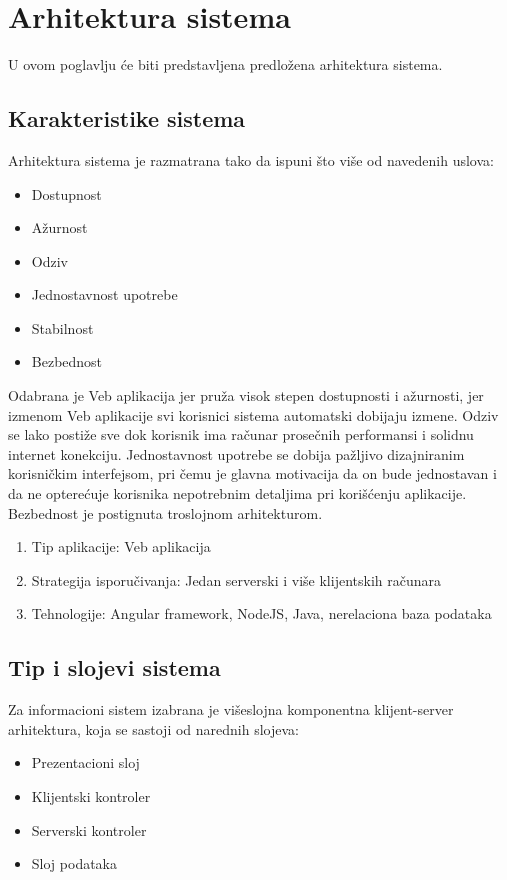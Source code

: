 \documentclass[a4paper]{article}
\begin{document}
\section{Arhitektura sistema}
U ovom poglavlju će biti predstavljena predložena arhitektura sistema.

\subsection{Karakteristike sistema}
Arhitektura sistema je razmatrana tako da ispuni što više od navedenih uslova:
\begin{itemize}
    \item Dostupnost
    \item Ažurnost
    \item Odziv
    \item Jednostavnost upotrebe
    \item Stabilnost
    \item Bezbednost
\end{itemize}
Odabrana je Veb aplikacija jer pruža visok stepen dostupnosti i ažurnosti, jer izmenom Veb aplikacije svi korisnici sistema automatski dobijaju izmene. Odziv se lako postiže sve dok korisnik ima računar prosečnih performansi i solidnu internet konekciju. Jednostavnost upotrebe se dobija pažljivo dizajniranim korisničkim interfejsom, pri čemu je glavna motivacija da on bude jednostavan i da ne opterećuje korisnika nepotrebnim detaljima pri korišćenju aplikacije. Bezbednost je postignuta troslojnom arhitekturom.

\begin{enumerate}
    \item Tip aplikacije: Veb aplikacija
    \item Strategija isporučivanja: Jedan serverski i više klijentskih računara
    \item Tehnologije: Angular framework, NodeJS, Java, nerelaciona baza podataka
\end{enumerate}

\subsection{Tip i slojevi sistema}

Za informacioni sistem izabrana je višeslojna komponentna klijent-server arhitektura, koja se sastoji od narednih slojeva:

\begin{itemize}
    \item Prezentacioni sloj
    \item Klijentski kontroler
    \item Serverski kontroler
    \item Sloj podataka
\end{itemize}
\end{document}
